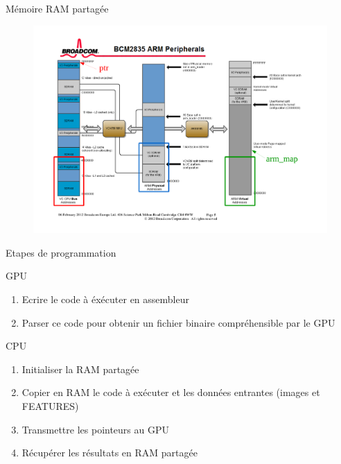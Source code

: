\documentclass{bredelebeamer}
\begin{document}

\begin{frame}{Mémoire RAM partagée}

\begin{figure}
\centering
\includegraphics[scale=0.3]{images/RAMptrs.pdf}
\end{figure}

\end{frame}


\begin{frame}{Etapes de programmation}

\begin{block}{GPU}
\begin{enumerate}
\item Ecrire le code à éxécuter en assembleur
\item Parser ce code pour obtenir un fichier binaire compréhensible par le GPU
\end{enumerate}
\end{block}

\begin{block}{CPU}
\begin{enumerate}
\item Initialiser la RAM partagée
\item Copier en RAM le code à exécuter et les données entrantes (images et FEATURES)
\item Transmettre les pointeurs au GPU
\item Récupérer les résultats en RAM partagée
\end{enumerate}
\end{block}

\end{frame}
\end{document}
